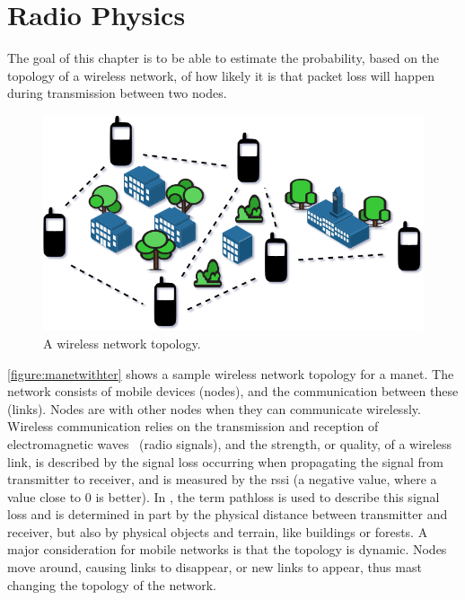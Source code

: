 \chapter{Radio Physics}\label{ch:radio-physics}
The goal of this chapter is to be able to estimate the probability, based on the topology of a wireless
network, of how likely it is that packet loss will happen during transmission between two nodes.


\begin{figure}[ht]
    \centering
    \includegraphics[width=.7\textwidth]{figures/manet_with_terrain.png}
    \caption{A wireless network topology.}
    \label{figure:manetwithter}
\end{figure}

\autoref{figure:manetwithter} shows a sample wireless network topology for a \acrfull{manet}. The network
consists of mobile devices (nodes), and the communication between these (links). Nodes are
 with other nodes when they can communicate wirelessly. Wireless communication
relies on the transmission and reception of electromagnetic waves~\cite[p.~10]{paper:linkmodel} (radio
signals), and the strength, or quality, of a wireless link, is described by the signal loss occurring when
propagating the signal from transmitter to receiver, and is measured by the \gls{rssi} (a negative value,
where a value close to 0 is better). In \cite{paper:linkmodel}, the term \gls{pathloss} is used to describe
this signal loss and is determined in part by the physical distance between transmitter and receiver, but
also by physical objects and terrain, like buildings or forests. A major consideration for mobile networks is
that the topology is dynamic. Nodes move around, causing links to disappear, or new links to appear, thus mast
changing the topology of the network.






